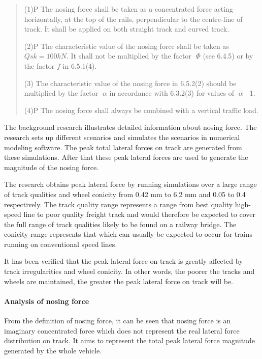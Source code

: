 \begin{quote}
	(1)P The nosing force shall be taken as a concentrated force acting horizontally, at the top of the rails, perpendicular to the centre-line of track. It shall be applied on both straight track and curved track.

	(2)P The characteristic value of the nosing force shall be taken as $Qsk = 100 kN$. It shall not be multiplied by the factor 􏰅$\Phi$ (see 6.4.5) or by the factor $f$ in 6.5.1(4).

	(3) The characteristic value of the nosing force in 6.5.2(2) should be multiplied by the factor 􏰀$\alpha$ in accordance with 6.3.2(3) for values of 􏰀$\alpha$ 􏰁 1.

	(4)P The nosing force shall always be combined with a vertical traffic load.
\end{quote}

The background research\citep{d181dt329} illustrates detailed information about nosing force. The research sets up different scenarios and simulates the scenarios in numerical modeling software. The peak total lateral forces on track are generated from these simulations. After that these peak lateral forces are used to generate the magnitude of the nosing force.

The research obtains peak lateral force by running simulations over a large range of track qualities and wheel conicity from 0.42 mm to 6.2 mm and 0.05 to 0.4 respectively. The track quality range represents a range from best quality high-speed line to poor quality freight track and would therefore be expected to cover the full range of track qualities likely to be found on a railway bridge. The conicity range represents that which can usually be expected to occur for trains running on conventional speed lines.

It has been verified that the peak lateral force on track is greatly affected by track irregularities and wheel conicity. In other words, the poorer the tracks and wheels are maintained, the greater the peak lateral force on track will be. 

\paragraph{Analysis of nosing force}
From the definition of nosing force, it can be seen that nosing force is an imaginary concentrated force which does not represent the real lateral force distribution on track. It aims to represent the total peak lateral force magnitude generated by the whole vehicle. 

